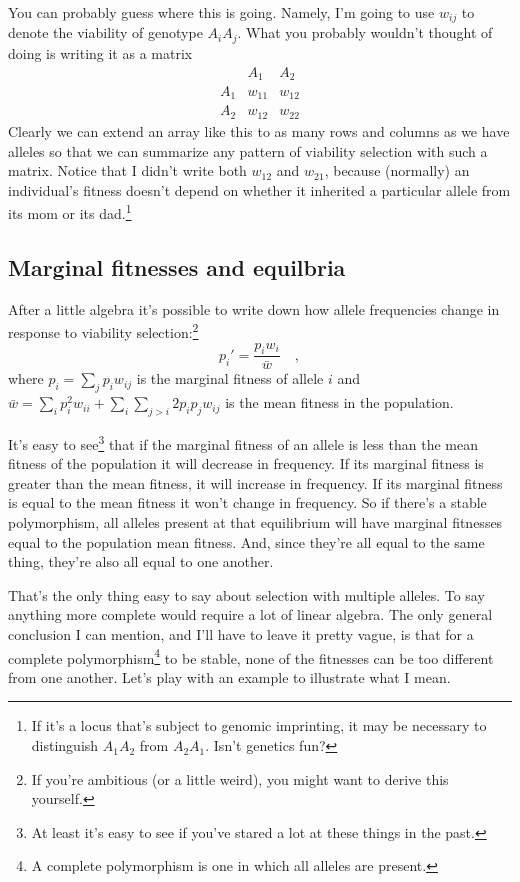\documentclass[12pt]{article}
\begin{document}
\noindent You can probably guess where this is going. Namely, I'm
going to use $w_{ij}$ to denote the viability of genotype
$A_iA_j$. What you probably wouldn't thought of doing is writing it as
a matrix
\[
\begin{array}{ccc}
    & A_1  & A_2 \\
A_1 & w_{11} & w_{12} \\
A_2 & w_{12} & w_{22}
\end{array}
\]
Clearly we can extend an array like this to as many rows and columns
as we have alleles so that we can summarize any pattern of viability
selection with such a matrix. Notice that I didn't write both $w_{12}$
and $w_{21}$, because (normally) an individual's fitness doesn't
depend on whether it inherited a particular allele from its mom or its
dad.\footnote{If it's a locus that's subject to genomic imprinting, it
  may be necessary to distinguish $A_1A_2$ from $A_2A_1$. Isn't
  genetics fun?}

\subsection*{Marginal fitnesses and
  equilbria}

After a little algebra it's possible to write down how allele
frequencies change in response to viability selection:\footnote{If
  you're ambitious (or a little weird), you might want to derive this
  yourself.}
\[
p_i' = \frac{p_iw_i}{\bar w} \quad ,
\]
where $p_i = \sum_j p_i w_{ij}$ is the marginal fitness of allele $i$ and
$\bar w = \sum_i p_i^2 w_{ii} + \sum_i\sum_{j>i} 2p_ip_jw_{ij}$ is the
mean fitness in the population.

It's easy to see\footnote{At least it's easy to see if you've stared a
  lot at these things in the past.} that if the marginal fitness of an
allele is less than the mean fitness of the population it will
decrease in frequency. If its marginal fitness is greater than the
mean fitness, it will increase in frequency.  If its marginal fitness
is equal to the mean fitness it won't change in frequency. So if
there's a stable polymorphism, all alleles present at that equilibrium
will have marginal fitnesses equal to the population mean
fitness. And, since they're all equal to the same thing, they're also
all equal to one another.

That's the only thing easy to say about selection with multiple
alleles. To say anything more complete would require a lot of linear
algebra. The only general conclusion I can mention, and I'll have to
leave it pretty vague, is that for a complete polymorphism\footnote{A
complete polymorphism is one in which all alleles are present.} to be
stable, none of the fitnesses can be too different from one
another. Let's play with an example to illustrate what I mean.
\end{document}
